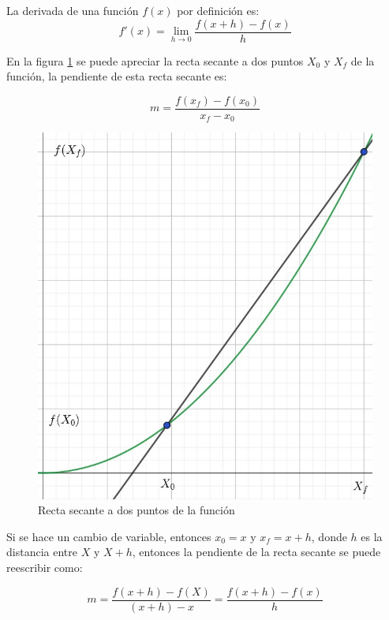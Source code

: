 La derivada de una función $f(x)$ por definición es:
\begin{equation}
    f'(x) = \lim_{{h \to 0}} \frac{f(x+h) - f(x)}{h}
    \label{eq:derivada}
\end{equation}

En la figura \ref{fig:secante} se puede apreciar la recta secante a dos puntos $X_0$ y $X_f$ de la función, la pendiente de esta recta secante es:

\begin{equation}
    m = \frac{f(x_f) - f(x_0)}{x_f - x_0}
    \label{eq:pendiente_secante}
\end{equation}

\begin{figure}[H]
    \centering
    \includegraphics[scale=0.45]{images/geogebra/derivadaDef1.jpeg}
    \caption{Recta secante a dos puntos de la función}
    \label{fig:secante}
\end{figure}

Si se hace un cambio de variable, entonces $x_0 = x$ y $x_f = x + h$, donde $h$ es la distancia entre $X$ y $X + h$, entonces la pendiente de la recta secante se puede reescribir como:

\begin{equation}
    m = \frac{f(x + h) - f(X)}{(x + h) - x} = \frac{f(x + h) - f(x)}{h}
    \label{eq:pendiente_secante_h}
\end{equation}

